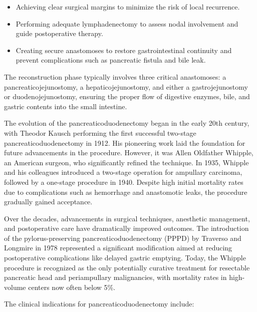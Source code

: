 \begin{itemize}
  \item Achieving clear surgical margins to minimize the risk of local recurrence.
  \item Performing adequate lymphadenectomy to assess nodal involvement and guide postoperative therapy.
  \item Creating secure anastomoses to restore gastrointestinal continuity and prevent complications such as pancreatic fistula and bile leak.
\end{itemize}

The reconstruction phase typically involves three critical anastomoses: a pancreaticojejunostomy, a hepaticojejunostomy, and either a gastrojejunostomy or duodenojejunostomy, ensuring the proper flow of digestive enzymes, bile, and gastric contents into the small intestine.

The evolution of the pancreaticoduodenectomy began in the early 20th century, with Theodor Kausch performing the first successful two-stage pancreaticoduodenectomy in 1912. His pioneering work laid the foundation for future advancements in the procedure. However, it was Allen Oldfather Whipple, an American surgeon, who significantly refined the technique. In 1935, Whipple and his colleagues introduced a two-stage operation for ampullary carcinoma, followed by a one-stage procedure in 1940. Despite high initial mortality rates due to complications such as hemorrhage and anastomotic leaks, the procedure gradually gained acceptance.

Over the decades, advancements in surgical techniques, anesthetic management, and postoperative care have dramatically improved outcomes. The introduction of the pylorus-preserving pancreaticoduodenectomy (PPPD) by Traverso and Longmire in 1978 represented a significant modification aimed at reducing postoperative complications like delayed gastric emptying. Today, the Whipple procedure is recognized as the only potentially curative treatment for resectable pancreatic head and periampullary malignancies, with mortality rates in high-volume centers now often below 5\%.

The clinical indications for pancreaticoduodenectomy include:

